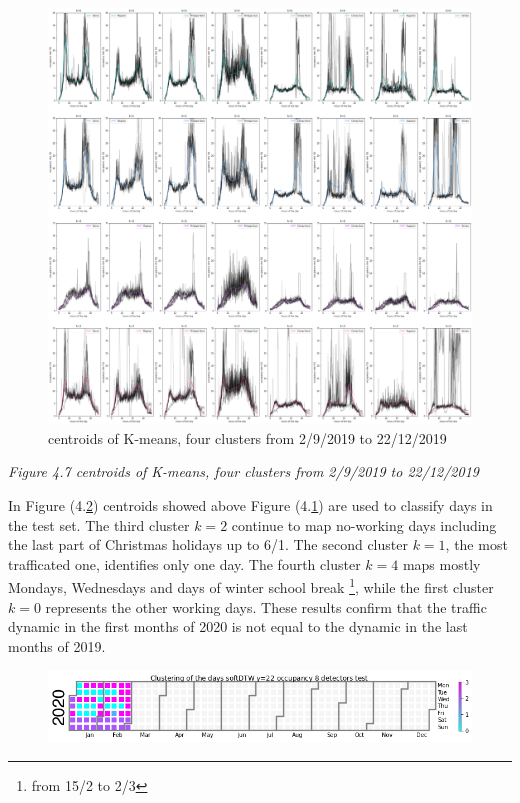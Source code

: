 \documentclass[11pt]{article}
\begin{document}
    \begin{figure}
    \centering
    \includegraphics{centroids softDTW K=4 sem2 2019.png}
    \caption{centroids of K-means, four clusters from 2/9/2019 to 22/12/2019}
    \label{fig:4.7}
\end{figure}

\emph{\small Figure 4.7 centroids of K-means, four clusters from 2/9/2019 to 22/12/2019}

    In Figure (4.\ref{fig:4.8}) centroids showed above Figure
(4.\ref{fig:4.7}) are used to classify days in the test set. The third
cluster \(k=2\) continue to map no-working days including the last part
of Christmas holidays up to 6/1. The second cluster \(k=1\), the most
trafficated one, identifies only one day. The fourth cluster \(k=4\)
maps mostly Mondays, Wednesdays and days of winter school break
\footnote{ from 15/2 to 2/3 }, while the first cluster \(k=0\)
represents the other working days. These results confirm that the
traffic dynamic in the first months of 2020 is not equal to the dynamic
in the last months of 2019.

    \begin{figure}
    \centering
    \includegraphics{softDTW K=4 2020 test.png}
    \caption{}
    \label{fig:4.8}
\end{figure}
\end{document}
